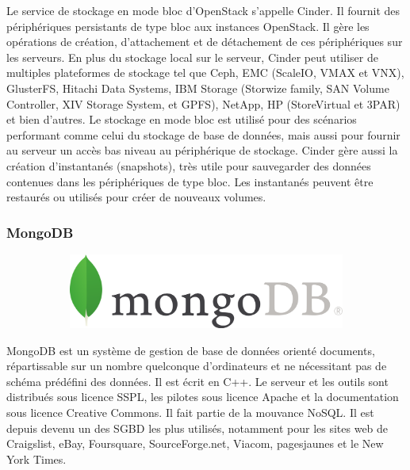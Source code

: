 \documentclass{article}
\begin{document}
Le service de stockage en mode bloc d'OpenStack s'appelle Cinder. Il fournit des périphériques persistants de type bloc aux instances OpenStack. Il gère les opérations de création, d'attachement et de détachement de ces périphériques sur les serveurs. En plus du stockage local sur le serveur, Cinder peut utiliser de multiples plateformes de stockage tel que Ceph, EMC (ScaleIO, VMAX et VNX), GlusterFS, Hitachi Data Systems, IBM Storage (Storwize family, SAN Volume Controller, XIV Storage System, et GPFS), NetApp, HP (StoreVirtual et 3PAR) et bien d'autres.
\newline
Le stockage en mode bloc est utilisé pour des scénarios performant comme celui du stockage de base de données, mais aussi pour fournir au serveur un accès bas niveau au périphérique de stockage. Cinder gère aussi la création d'instantanés (snapshots), très utile pour sauvegarder des données contenues dans les périphériques de type bloc. Les instantanés peuvent être restaurés ou utilisés pour créer de nouveaux volumes.
\newpage


\newpage

\subsubsection{MongoDB}
\begin{figure}[h!]
	\centering
  	\begin{subfigure}[b]{0.55\linewidth}
	\includegraphics[width=\linewidth]{mongo.png}
  	\end{subfigure}
\end{figure}

MongoDB est un système de gestion de base de données orienté documents, répartissable sur un nombre quelconque d'ordinateurs et ne nécessitant pas de schéma prédéfini des données. Il est écrit en C++. Le serveur et les outils sont distribués sous licence SSPL, les pilotes sous licence Apache et la documentation sous licence Creative Commons. Il fait partie de la mouvance NoSQL. 
\newline
Il est depuis devenu un des SGBD les plus utilisés, notamment pour les sites web de Craigslist, eBay, Foursquare, SourceForge.net, Viacom, pagesjaunes et le New York Times. 
\end{document}
